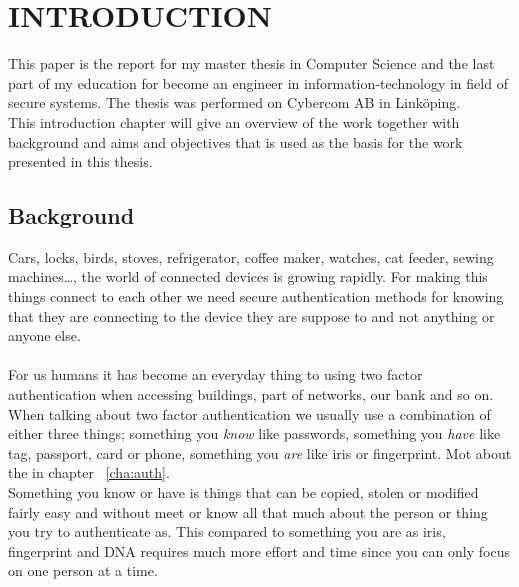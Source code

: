 \chapter{INTRODUCTION}\label{cha:intro}
This paper is the report for my master thesis in Computer Science and the last part of my education for become an engineer in information-technology in field of secure systems. The thesis was performed on Cybercom AB in Linköping. \\
This introduction chapter will give an overview of the work together with background and aims and objectives that is used as the basis for the work presented in this thesis. 

\section{Background}\label{sec:bg}
Cars, locks, birds, stoves, refrigerator, coffee maker, watches, cat feeder, sewing machines\dots, the world of connected devices is growing rapidly. For making this things connect to each other we need secure authentication methods for knowing that they are connecting to the device they are suppose to and not anything or anyone else. \\
\\
For us humans it has become an everyday thing to using two factor authentication when accessing buildings, part of networks, our bank and so on. When talking about two factor authentication we usually use a combination of either three things; something you \textit{know} like passwords, something you \textit{have} like tag, passport, card or phone, something you \textit{are} like iris or fingerprint. Mot about the in chapter ~\ref{cha:auth}.\\
Something you know or have is things that can be copied, stolen or modified fairly easy and without meet or know all that much about the person or thing you try to authenticate as. This compared to something you are as iris, fingerprint and DNA requires much more effort and time since you can only focus on one person at a time. 

